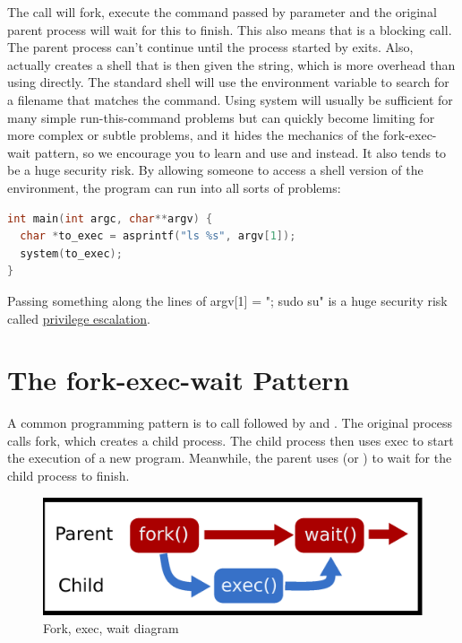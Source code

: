 The  call will fork, execute the command passed by parameter and the original parent process will wait for this to finish.
This also means that  is a blocking call.
The parent process can't continue until the process started by  exits.
Also,  actually creates a shell that is then given the string, which is more overhead than using  directly.
The standard shell will use the  environment variable to search for a filename that matches the command.
Using system will usually be sufficient for many simple run-this-command problems but can quickly become limiting for more complex or subtle problems, and it hides the mechanics of the fork-exec-wait pattern, so we encourage you to learn and use   and  instead.
It also tends to be a huge security risk.
By allowing someone to access a shell version of the environment, the program can run into all sorts of problems:

\begin{lstlisting}[language=C]
int main(int argc, char**argv) {
  char *to_exec = asprintf("ls %s", argv[1]);
  system(to_exec);
}
\end{lstlisting}

Passing something along the lines of argv[1] = "; sudo su" is a huge security risk called \href{https://en.wikipedia.org/wiki/Privilege\_escalation}{privilege escalation}.

\section{The fork-exec-wait Pattern}

A common programming pattern is to call  followed by  and .
The original process calls fork, which creates a child process.
The child process then uses exec to start the execution of a new program.
Meanwhile, the parent uses  (or ) to wait for the child process to finish.

\begin{figure}[H]
\centering
\includegraphics[width=.7\textwidth]{processes/drawings/fork_exec_wait.eps}
\caption{Fork, exec, wait diagram}
\end{figure}

